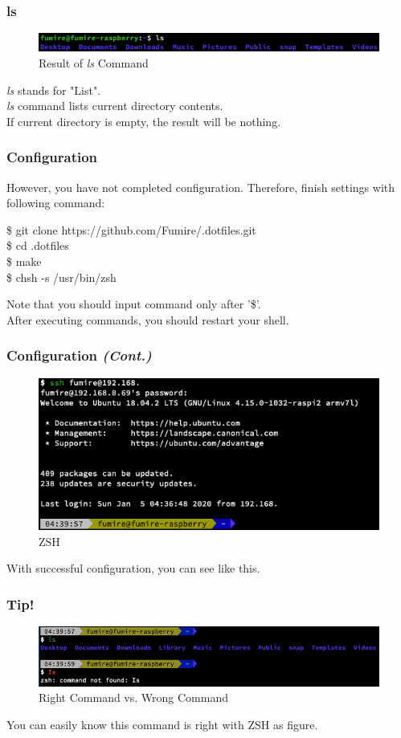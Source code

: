 \documentclass{beamer}
\begin{document}
	\begin{frame}
		\frametitle{ls}
		\begin{figure}[h!]
			\centering
			\includegraphics[width=0.7 \linewidth]{figures/3.png}
			\caption{Result of \textit{ls} Command}
		\end{figure}
	
		\textit{ls} stands for "List". \\
		\textit{ls} command lists current directory contents. \\
		If current directory is empty, the result will be nothing. 
	\end{frame}

	\begin{frame}
		\frametitle{Configuration}
		However, you have not completed configuration. Therefore, finish settings with following command:
		\begin{example}
			\$ git clone https://github.com/Fumire/.dotfiles.git \\
			\$ cd .dotfiles \\
			\$ make \\
			\$ chsh -s /usr/bin/zsh
		\end{example}
		Note that you should input command only after '\$'. \\
		After executing commands, you should restart your shell. 
	\end{frame}

	\begin{frame}
		\frametitle{Configuration \textit{(Cont.)}}
		\begin{figure}[h!]
			\centering
			\includegraphics[width=0.7 \linewidth]{figures/4.png}
			\caption{ZSH}
		\end{figure}
	
		With successful configuration, you can see like this. 
	\end{frame}

	\begin{frame}
		\frametitle{Tip!}
		\begin{figure}[h!]
			\centering
			\includegraphics[width=0.7 \linewidth]{figures/5.png}
			\caption{Right Command vs. Wrong Command}
		\end{figure}
		
		You can easily know this command is right with ZSH as figure.  
	\end{frame}
\end{document}
